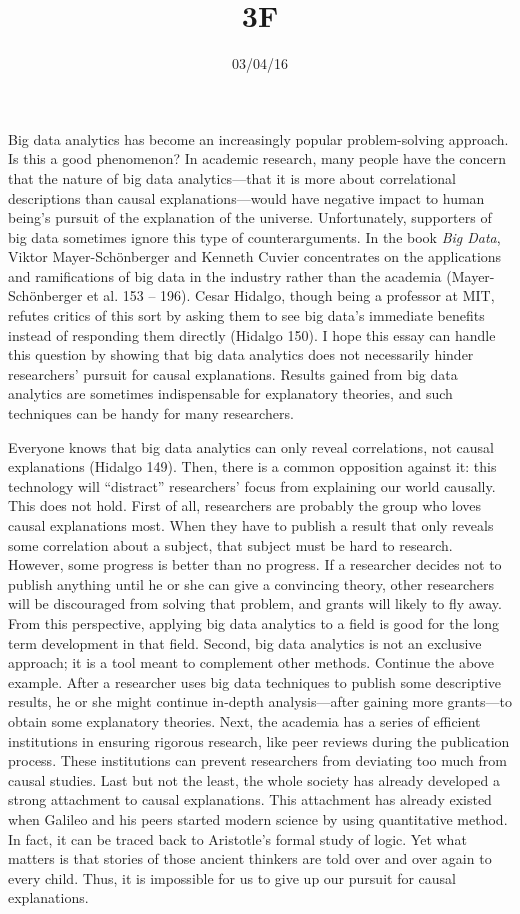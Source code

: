 \documentclass{writing}
\title{3F}
\date{03/04/16}
\begin{document}
\maketitle

Big data analytics has become an increasingly popular problem-solving
approach. Is this a good phenomenon? In academic research, many people
have the concern that the nature of big data analytics---that it is more
about correlational descriptions than causal explanations---would have
negative impact to human being's pursuit of the explanation of the
universe. Unfortunately, supporters of big data sometimes ignore this
type of counterarguments. In the book \emph{Big Data}, Viktor
Mayer-Schönberger and Kenneth Cuvier concentrates on the applications
and ramifications of big data in the industry rather than the academia
(Mayer-Schönberger et al. 153 -- 196). Cesar Hidalgo, though being a
professor at MIT, refutes critics of this sort by asking them to see big
data's immediate benefits instead of responding them directly (Hidalgo
150). I hope this essay can handle this question by showing that big
data analytics does not necessarily hinder researchers' pursuit for
causal explanations. Results gained from big data analytics are
sometimes indispensable for explanatory theories, and such techniques
can be handy for many researchers.

Everyone knows that big data analytics can only reveal correlations, not
causal explanations (Hidalgo 149). Then, there is a common opposition
against it: this technology will ``distract'' researchers' focus from
explaining our world causally. This does not hold. First of all,
researchers are probably the group who loves causal explanations most.
When they have to publish a result that only reveals some correlation
about a subject, that subject must be hard to research. However, some
progress is better than no progress. If a researcher decides not to
publish anything until he or she can give a convincing theory, other
researchers will be discouraged from solving that problem, and grants
will likely to fly away. From this perspective, applying big data
analytics to a field is good for the long term development in that
field. Second, big data analytics is not an exclusive approach; it is a
tool meant to complement other methods. Continue the above example.
After a researcher uses big data techniques to publish some descriptive
results, he or she might continue in-depth analysis---after gaining more
grants---to obtain some explanatory theories. Next, the academia has a
series of efficient institutions in ensuring rigorous research, like
peer reviews during the publication process. These institutions can
prevent researchers from deviating too much from causal studies. Last
but not the least, the whole society has already developed a strong
attachment to causal explanations. This attachment has already existed
when Galileo and his peers started modern science by using quantitative
method. In fact, it can be traced back to Aristotle's formal study of
logic. Yet what matters is that stories of those ancient thinkers are
told over and over again to every child. Thus, it is impossible for us
to give up our pursuit for causal explanations.
\end{document}
